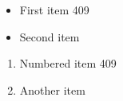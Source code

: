\documentclass{article}
\begin{document}
\begin{itemize}
\item First item 409
\item Second item
\end{itemize}
\begin{enumerate}
\item Numbered item 409
\item Another item
\end{enumerate}
\end{document}
